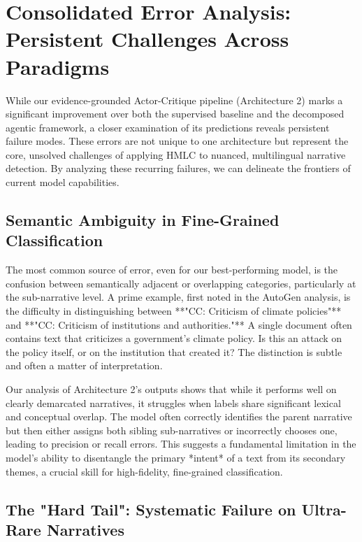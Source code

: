 \section{Consolidated Error Analysis: Persistent Challenges Across Paradigms}

While our evidence-grounded Actor-Critique pipeline (Architecture 2) marks a significant improvement over both the supervised baseline and the decomposed agentic framework, a closer examination of its predictions reveals persistent failure modes. These errors are not unique to one architecture but represent the core, unsolved challenges of applying HMLC to nuanced, multilingual narrative detection. By analyzing these recurring failures, we can delineate the frontiers of current model capabilities.

\subsection{Semantic Ambiguity in Fine-Grained Classification}

The most common source of error, even for our best-performing model, is the confusion between semantically adjacent or overlapping categories, particularly at the sub-narrative level. A prime example, first noted in the AutoGen analysis, is the difficulty in distinguishing between **"CC: Criticism of climate policies"** and **"CC: Criticism of institutions and authorities."** A single document often contains text that criticizes a government's climate policy. Is this an attack on the policy itself, or on the institution that created it? The distinction is subtle and often a matter of interpretation.

Our analysis of Architecture 2's outputs shows that while it performs well on clearly demarcated narratives, it struggles when labels share significant lexical and conceptual overlap. The model often correctly identifies the parent narrative but then either assigns both sibling sub-narratives or incorrectly chooses one, leading to precision or recall errors. This suggests a fundamental limitation in the model's ability to disentangle the primary *intent* of a text from its secondary themes, a crucial skill for high-fidelity, fine-grained classification.

\subsection{The "Hard Tail": Systematic Failure on Ultra-Rare Narratives}

